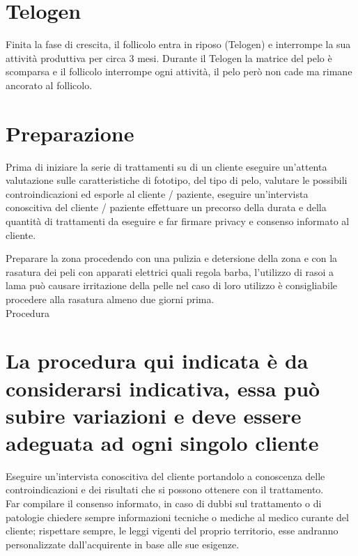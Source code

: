 \documentclass[10pt]{article}
\begin{document}
\section{Telogen}
Finita la fase di crescita, il follicolo entra in riposo (Telogen) e interrompe la sua attività produttiva per circa 3 mesi. Durante il Telogen la matrice del pelo è scomparsa e il follicolo interrompe ogni attività, il pelo però non cade ma rimane ancorato al follicolo.

\section{Preparazione}
Prima di iniziare la serie di trattamenti su di un cliente eseguire un'attenta valutazione sulle caratteristiche di fototipo, del tipo di pelo, valutare le possibili controindicazioni ed esporle al cliente / paziente, eseguire un'intervista conoscitiva del cliente / paziente effettuare un precorso della durata e della quantità di trattamenti da eseguire e far firmare privacy e consenso informato al cliente.

Preparare la zona procedendo con una pulizia e detersione della zona e con la rasatura dei peli con apparati elettrici quali regola barba, l'utilizzo di rasoi a lama può causare irritazione della pelle nel caso di loro utilizzo è consigliabile procedere alla rasatura almeno due giorni prima.\\
Procedura

\section{La procedura qui indicata è da considerarsi indicativa, essa può subire variazioni e deve essere adeguata ad ogni singolo cliente}
Eseguire un'intervista conoscitiva del cliente portandolo a conoscenza delle controindicazioni e dei risultati che si possono ottenere con il trattamento.\\
Far compilare il consenso informato, in caso di dubbi sul trattamento o di patologie chiedere sempre informazioni tecniche o mediche al medico curante del cliente; rispettare sempre, le leggi vigenti del proprio territorio, esse andranno personalizzate dall'acquirente in base alle sue esigenze.
\end{document}

